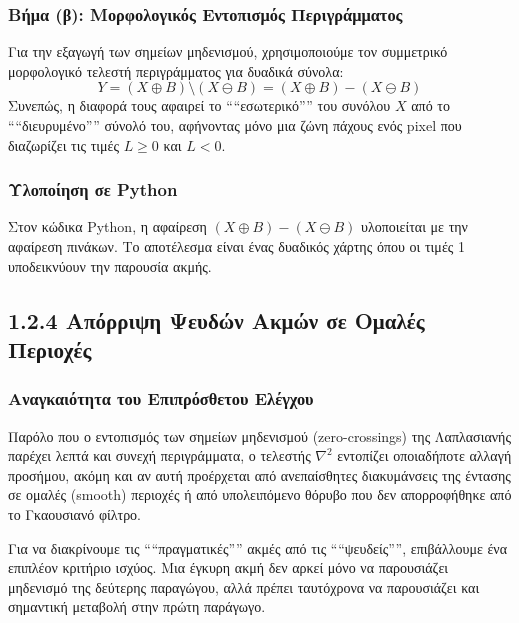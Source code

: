 \documentclass[12pt,a4paper]{article}
\begin{document}
\subsubsection*{Βήμα (β): Μορφολογικός Εντοπισμός Περιγράμματος}
\hspace{0.6cm}Για την εξαγωγή των σημείων μηδενισμού, χρησιμοποιούμε τον συμμετρικό μορφολογικό τελεστή περιγράμματος για δυαδικά σύνολα:
\begin{equation}
Y = (X \oplus B) \setminus (X \ominus B) = (X \oplus B) - (X \ominus B)
\end{equation}
\hspace{0.6cm}Συνεπώς, η διαφορά τους αφαιρεί το ````εσωτερικό'''' του συνόλου $X$ από το ````διευρυμένο'''' σύνολό του, αφήνοντας μόνο μια ζώνη πάχους ενός \foreignlanguage{english}{pixel} που διαζωρίζει τις τιμές $L \geq 0$ και $L < 0$. 

\subsubsection*{Υλοποίηση σε \foreignlanguage{english}{Python}}
\hspace{0.6cm}Στον κώδικα \foreignlanguage{english}{Python}, η αφαίρεση $(X \oplus B) - (X \ominus B)$ υλοποιείται με την αφαίρεση πινάκων. Το αποτέλεσμα είναι ένας δυαδικός χάρτης όπου οι τιμές 1 υποδεικνύουν την παρουσία ακμής.

\subsection*{1.2.4 Απόρριψη Ψευδών Ακμών σε Ομαλές Περιοχές}

\subsubsection*{Αναγκαιότητα του Επιπρόσθετου Ελέγχου}
\hspace{0.6cm}Παρόλο που ο εντοπισμός των σημείων μηδενισμού (\foreignlanguage{english}{zero-crossings}) της Λαπλασιανής παρέχει λεπτά και συνεχή περιγράμματα, ο τελεστής $\nabla^2$ εντοπίζει οποιαδήποτε αλλαγή προσήμου, ακόμη και αν αυτή προέρχεται από ανεπαίσθητες διακυμάνσεις της έντασης σε ομαλές (\foreignlanguage{english}{smooth}) περιοχές ή από υπολειπόμενο θόρυβο που δεν απορροφήθηκε από το Γκαουσιανό φίλτρο.

Για να διακρίνουμε τις ````πραγματικές'''' ακμές από τις ````ψευδείς'''', επιβάλλουμε ένα επιπλέον κριτήριο ισχύος. Μια έγκυρη ακμή δεν αρκεί μόνο να παρουσιάζει μηδενισμό της δεύτερης παραγώγου, αλλά πρέπει ταυτόχρονα να παρουσιάζει και σημαντική μεταβολή στην πρώτη παράγωγο.
\end{document}

